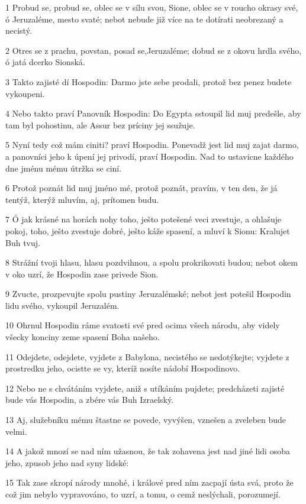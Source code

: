 \par 1 Probud se, probud se, oblec se v sílu svou, Sione, oblec se v roucho okrasy své, ó Jeruzaléme, mesto svaté; nebot nebude již více na te dotírati neobrezaný a necistý.
\par 2 Otres se z prachu, povstan, posad se,Jeruzaléme; dobud se z okovu hrdla svého, ó jatá dcerko Sionská.
\par 3 Takto zajisté dí Hospodin: Darmo jste sebe prodali, protož bez penez budete vykoupeni.
\par 4 Nebo takto praví Panovník Hospodin: Do Egypta sstoupil lid muj predešle, aby tam byl pohostinu, ale Assur bez príciny jej ssužuje.
\par 5 Nyní tedy což mám ciniti? praví Hospodin. Ponevadž jest lid muj zajat darmo, a panovníci jeho k úpení jej privodí, praví Hospodin. Nad to ustavicne každého dne jménu mému útržka se ciní.
\par 6 Protož poznát lid muj jméno mé, protož poznát, pravím, v ten den, že já tentýž, kterýž mluvím, aj, prítomen budu.
\par 7 Ó jak krásné na horách nohy toho, ješto potešené veci zvestuje, a ohlašuje pokoj, toho, ješto zvestuje dobré, ješto káže spasení, a mluví k Sionu: Kralujet Buh tvuj.
\par 8 Strážní tvoji hlasu, hlasu pozdvihnou, a spolu prokrikovati budou; nebot okem v oko uzrí, že Hospodin zase privede Sion.
\par 9 Zvucte, prozpevujte spolu pustiny Jeruzalémské; nebot jest potešil Hospodin lidu svého, vykoupil Jeruzalém.
\par 10 Ohrnul Hospodin ráme svatosti své pred ocima všech národu, aby videly všecky konciny zeme spasení Boha našeho.
\par 11 Odejdete, odejdete, vyjdete z Babylona, necistého se nedotýkejte; vyjdete z prostredku jeho, ocistte se vy, kteríž nosíte nádobí Hospodinovo.
\par 12 Nebo ne s chvátáním vyjdete, aniž s utíkáním pujdete; predcházeti zajisté bude vás Hospodin, a zbére vás Buh Izraelský.
\par 13 Aj, služebníku mému štastne se povede, vyvýšen, vznešen a zveleben bude velmi.
\par 14 A jakož mnozí se nad ním užasnou, že tak zohavena jest nad jiné lidi osoba jeho, zpusob jeho nad syny lidské:
\par 15 Tak zase skropí národy mnohé, i králové pred ním zacpají ústa svá, proto že což jim nebylo vypravováno, to uzrí, a tomu, o cemž neslýchali, porozumejí.

